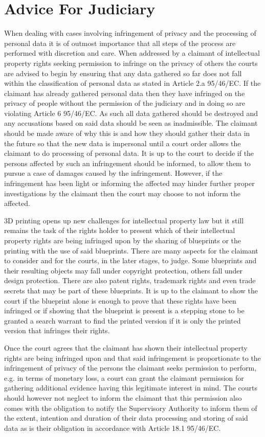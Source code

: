 \section{Advice For Judiciary}
When dealing with cases involving infringement of privacy and the processing of personal data it is of outmost importance that all steps of the process are performed with discretion and care.
When addressed by a claimant of intellectual property rights seeking permission to infringe on the privacy of others the courts are advised to begin by ensuring that any data gathered so far does not fall within the classification of personal data as stated in Article 2.a 95/46/EC.
If the claimant has already gathered personal data then they have infringed on the privacy of people without the permission of the judiciary and in doing so are violating Article 6 95/46/EC.
As such all data gathered should be destroyed and any accusations based on said data should be seen as inadmissible.
The claimant should be made aware of why this is and how they should gather their data in the future so that the new data is impersonal until a court order allows the claimant to do processing of personal data.
It is up to the court to decide if the persons affected by such an infringement should be informed, to allow them to pursue a case of damages caused by the infringement.
However, if the infringement has been light or informing the affected may hinder further proper investigations by the claimant then the court may choose to not inform the affected.

3D printing opens up new challenges for intellectual property law but it still remains the task of the rights holder to present which of their intellectual property rights are being infringed upon by the sharing of blueprints or the printing with the use of said blueprints.
There are many aspects for the claimant to consider and for the courts, in the later stages, to judge.
Some blueprints and their resulting objects may fall under copyright protection, others fall under design protection.
There are also patent rights, trademark rights and even trade secrets that may be part of these blueprints.
It is up to the claimant to show the court if the blueprint alone is enough to prove that these rights have been infringed or if showing that the blueprint is present is a stepping stone to be granted a search warrant to find the printed version if it is only the printed version that infringes their rights.

Once the court agrees that the claimant has shown their intellectual property rights are being infringed upon and that said infringement is proportionate to the infringement of privacy of the persons the claimant seeks permission to perform, e.g. in terms of monetary loss, a court can grant the claimant permission for gathering additional evidence having this legitimate interest in mind.
The courts should however not neglect to inform the claimant that this permission also comes with the obligation to notify the Supervisory Authority to inform them of the extent, intention and duration of their data processing and storing of said data as is their obligation in accordance with Article 18.1 95/46/EC.

